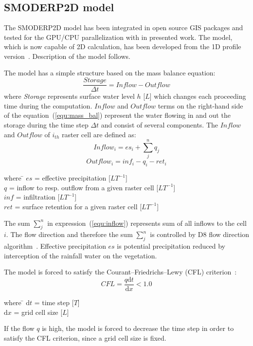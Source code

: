 \subsection{SMODERP2D model}
The SMODERP2D model has been integrated in open source 
GIS packages and tested for the GPU/CPU parallelization
with in presented work. The model, which is now capable of 2D
calculation, has been developed from the 1D profile version~\cite{Holy1984}. 
Description of the model follows.

The model has a simple structure based on the mass balance equation:
\begin{equation}\label{equ:mass_bal}
    \frac{Storage}{\Delta t} = \nonumber  
    Inflow - Outflow
\end{equation}
where {\it Storage} represents 
surface water level $h$ [$L$] which changes each proceeding time
during the computation. $Inflow$ and $Outflow$ terms on the right-hand side of
the equation~(\ref{equ:mass_bal}) represent the water flowing in and out the storage 
during the time step ${\Delta t}$ and consist of several components.
The $Inflow$ and $Outflow$ of $i_{th}$ raster cell are defined as:
\begin{equation}\label{equ:inflow}
    Inflow_i = es_{i} + \sum_j^n q_{j}
\end{equation}
\begin{equation}\label{equ:outflow}
    Outflow_i = inf_{i} - q_{i} - ret_i
\end{equation}
\begin{tabbing} 
where \hspace{0.6cm} \= $es$ = effective precipitation [$LT^{-1}$]\\
\> $q$ = inflow to resp. outflow from a given raster cell [$LT^{-1}$]\\
\> $inf$ = infiltration [$LT^{-1}$]\\
\> $ret$ = surface retention for a given raster cell [$LT^{-1}$]
\end{tabbing}
The sum $\sum_j^n$ in expression~(\ref{equ:inflow}) represents sum of all inflows to the cell $i$. 
The flow direction and therefore the sum $\sum_j^n$
is controlled by D8 flow direction algorithm~\cite{ocallaghan1984}.  Effective
precipitation $es$ is potential precipitation reduced by
interception of the rainfall water on the vegetation.

The model is forced to satisfy the Courant--Friedrichs--Lewy (CFL)
criterion~\cite{courant1928}:
\begin{equation}\label{equ:CFL}
    CFL = \frac{q\textrm{d}t}{\textrm{d}x} < 1.0
\end{equation}
\begin{tabbing} 
where \hspace{0.6cm} \= $\textrm{d}t$ = time step [$T$]\\
\> $\textrm{d}x$ = grid cell size [$L$]
\end{tabbing}
If the flow $q$ is high, the model is forced to decrease the
time step in order to satisfy the CFL criterion, since a grid cell size
is fixed.

